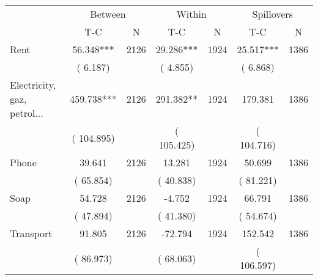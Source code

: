 
\begin{tabular}{l*{6}{c}}\hline&\multicolumn{2}{c}{Between}&\multicolumn{2}{c}{Within}&\multicolumn{2}{c}{Spillovers} \\ \cmidrule(r){2-3}\cmidrule(l){4-5}\cmidrule(l){6-7} & {T-C} & {N} & {T-C} & {N}  & {T-C}  & {N}  \\ \midrule
Rent        &             56.348***      &       2126       &             29.286***      &       1924       &             25.517***      &       1386       \\
                       &       (       6.187)            &                               &       (       4.855)            &                               &       (       6.868)            &                               \\
Electricity, gaz, petrol...        &            459.738***      &       2126       &            291.382**      &       1924       &            179.381      &       1386       \\
                       &       (     104.895)            &                               &       (     105.425)            &                               &       (     104.716)            &                               \\
Phone        &             39.641      &       2126       &             13.281      &       1924       &             50.699      &       1386       \\
                       &       (      65.854)            &                               &       (      40.838)            &                               &       (      81.221)            &                               \\
Soap        &             54.728      &       2126       &             -4.752      &       1924       &             66.791      &       1386       \\
                       &       (      47.894)            &                               &       (      41.380)            &                               &       (      54.674)            &                               \\
Transport        &             91.805      &       2126       &            -72.794      &       1924       &            152.542      &       1386       \\
                       &       (      86.973)            &                               &       (      68.063)            &                               &       (     106.597)            &                               \\

\end{tabular}
